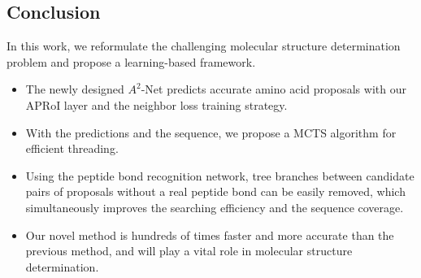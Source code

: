 \documentclass[final, xcolor=cmyk]{beamer}
\begin{document}
\begin{poster}
\section{Conclusion}
In this work, we reformulate the challenging molecular structure determination problem and propose a learning-based framework. 
\begin{itemize}
    \item The newly designed $A^2$-Net predicts accurate amino acid proposals with our APRoI layer and the neighbor loss training strategy. 
    \item With the predictions and the sequence, we propose a MCTS algorithm for efficient threading. 
    \item Using the peptide bond recognition network, tree branches between candidate pairs of proposals without a real peptide bond can be easily removed, which simultaneously improves the searching efficiency and the sequence coverage. 
    \item Our novel method is hundreds of times faster and more accurate than the previous method, and will play a vital role in molecular structure determination.
\end{itemize}

\end{poster}
\end{document}
